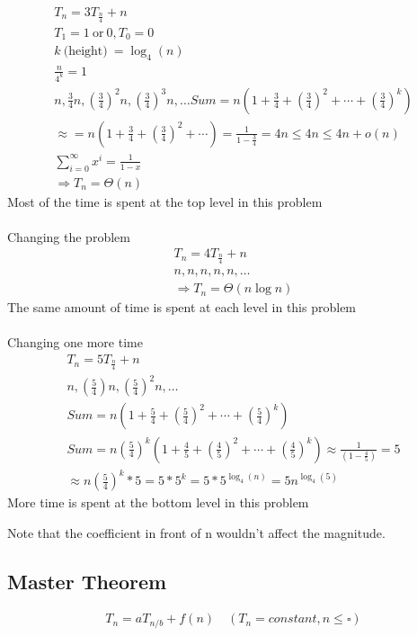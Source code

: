 \documentclass[class=scrartcl, crop=false]{standalone}
\begin{document}
\begin{example}
  \begin{gather*}
    T_n = 3T_{\frac{n}{4}} + n \\
    T_1 = 1 \ \text{or} \ 0, T_0 = 0 \\
    k \ \text{(height)} \ = \log_4(n) \\
    \frac{n}{4^k} = 1 \\
    n, \frac{3}{4}n, (\frac{3}{4})^2n, (\frac{3}{4})^3n, \dots
    Sum = n(1 + \frac{3}{4} + (\frac{3}{4})^2 + \cdots + (\frac{3}{4})^k) \\
    \approx = n(1 + \frac{3}{4} + (\frac{3}{4})^2 + \cdots) = \frac{1}{1 - \frac{3}{4}} = 4n \leq 4n \leq 4n + o(n) \\ %
    \sum_{i = 0}^{\infty}x^i = \frac{1}{1 - x} \\
    \Rightarrow T_n = \Theta(n)
  \end{gather*} 
  Most of the time is spent at the top level in this problem
  \\\\
  Changing the problem
  \begin{gather*}
    T_n = 4T_{\frac{n}{4}} + n \\
    n, n, n, n, n, \dots \\
    \Rightarrow T_n = \Theta(n\log n)
  \end{gather*} 
  The same amount of time is spent at each level in this problem \\\\
  Changing one more time
  \begin{gather*}
    T_n = 5T_{\frac{n}{4}} + n \\
    n, (\frac{5}{4})n, (\frac{5}{4})^2n, \dots \\
    Sum = n(1 + \frac{5}{4} + (\frac{5}{4})^2 + \cdots + (\frac{5}{4})^k) \\
    Sum = n(\frac{5}{4})^k(1 + \frac{4}{5} + (\frac{4}{5})^2 + \cdots + (\frac{4}{5})^k) \approx \frac{1}{(1 - \frac{4}{5})} = 5 \\
    \approx n(\frac{5}{4})^k*5 = 5 * 5^k = 5 * 5^{\log_4(n)} = 5n^{\log_4(5)} %
  \end{gather*} 
  More time is spent at the bottom level in this problem
\end{example} 
Note that the coefficient in front of n wouldn't affect the magnitude.

\subsection{Master Theorem}
\begin{gather*}
  T_n = aT_{n / b} + f(n) \quad (T_n = constant, n \leq \square) \\
\end{gather*} 
\end{document}

